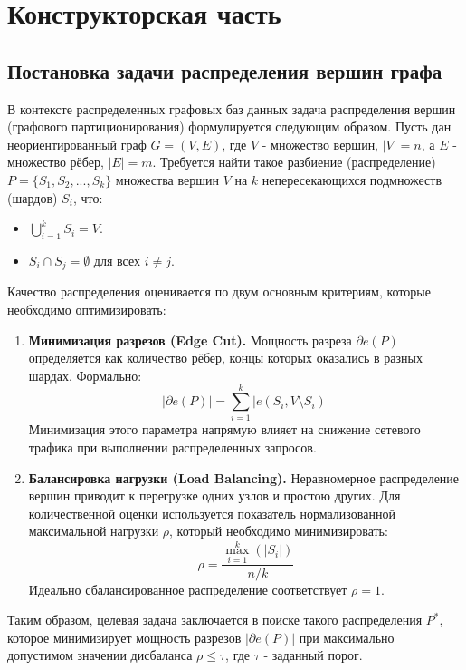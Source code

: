 \section{Конструкторская часть}

\subsection{Постановка задачи распределения вершин графа}

В контексте распределенных графовых баз данных задача распределения вершин (графового партиционирования) формулируется следующим образом. Пусть дан неориентированный граф \(G = (V, E)\), где \(V\) - множество вершин, \(|V| = n\), а \(E\) - множество рёбер, \(|E| = m\). Требуется найти такое разбиение (распределение) \(P = \{S_1, S_2, ..., S_k\}\) множества вершин \(V\) на \(k\) непересекающихся подмножеств (шардов) \(S_i\), что:
\begin{itemize}
    \item \(\bigcup_{i=1}^{k} S_i = V\).
    \item \(S_i \cap S_j = \emptyset\) для всех \(i \neq j\).
\end{itemize}

Качество распределения оценивается по двум основным критериям, которые необходимо оптимизировать:
\begin{enumerate}
    \item \textbf{Минимизация разрезов (Edge Cut).} Мощность разреза \(\partial e(P)\) определяется как количество рёбер, концы которых оказались в разных шардах. Формально:
    $$
    |\partial e(P)| = \sum_{i=1}^{k} |e(S_i, V \setminus S_i)|
    $$
    Минимизация этого параметра напрямую влияет на снижение сетевого трафика при выполнении распределенных запросов.
    \item \textbf{Балансировка нагрузки (Load Balancing).} Неравномерное распределение вершин приводит к перегрузке одних узлов и простою других. Для количественной оценки используется показатель нормализованной максимальной нагрузки \(\rho\), который необходимо минимизировать:
    $$
    \rho = \frac{\max_{i=1}^{k} (|S_i|)}{n/k}
    $$
    Идеально сбалансированное распределение соответствует \(\rho = 1\).
\end{enumerate}
Таким образом, целевая задача заключается в поиске такого распределения \(P^*\), которое минимизирует мощность разрезов \(|\partial e(P)|\) при максимально допустимом значении дисбаланса \(\rho \leq \tau\), где \(\tau\) - заданный порог.

